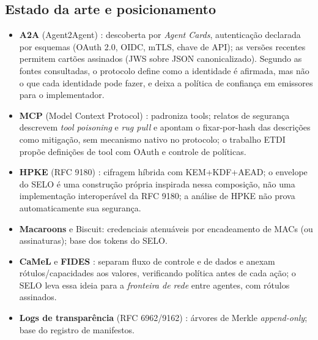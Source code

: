 \documentclass[11pt,a4paper]{article}
\theoremstyle{plain}
\theoremstyle{definition}
\theoremstyle{remark}
\begin{document}
\subsection{Estado da arte e posicionamento}

\begin{itemize}
  \item \textbf{A2A} (Agent2Agent) \cite{a2a}: descoberta por \emph{Agent Cards}, autenticação declarada por esquemas (OAuth 2.0, OIDC, mTLS, chave de API); as versões recentes permitem cartões assinados (JWS sobre JSON canonicalizado). Segundo as fontes consultadas, o protocolo define como a identidade é afirmada, mas não o que cada identidade pode fazer, e deixa a política de confiança em emissores para o implementador.
  \item \textbf{MCP} (Model Context Protocol) \cite{mcp}: padroniza tools; relatos de segurança descrevem \emph{tool poisoning} e \emph{rug pull} e apontam o fixar-por-hash das descrições como mitigação, sem mecanismo nativo no protocolo; o trabalho ETDI \cite{etdi} propõe definições de tool com OAuth e controle de políticas.
  \item \textbf{HPKE} (RFC 9180) \cite{hpke}: cifragem híbrida com KEM+KDF+AEAD; o envelope do SELO é uma construção própria inspirada nessa composição, não uma implementação interoperável da RFC 9180; a análise de HPKE não prova automaticamente sua segurança.
  \item \textbf{Macaroons} \cite{macaroons} e Biscuit: credenciais atenuáveis por encadeamento de MACs (ou assinaturas); base dos tokens do SELO.
  \item \textbf{CaMeL} \cite{camel} e \textbf{FIDES} \cite{fides}: separam fluxo de controle e de dados e anexam rótulos/capacidades aos valores, verificando política antes de cada ação; o SELO leva essa ideia para a \emph{fronteira de rede} entre agentes, com rótulos assinados.
  \item \textbf{Logs de transparência} (RFC 6962/9162) \cite{ct}: árvores de Merkle \emph{append-only}; base do registro de manifestos.
\end{itemize}
\end{document}
